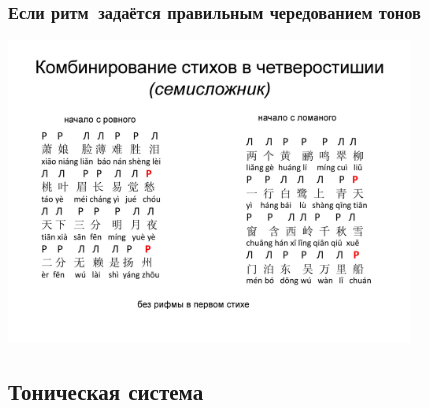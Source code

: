 \documentclass{beamer}
\begin{document}
\begin{frame}
\frametitle{Если ритм~задаётся правильным чередованием тонов}
\begin{center}
\includegraphics[width=0.8\textwidth]{cn.png}
\end{center}
\end{frame}


\subsection{Тоническая система}\label{sec:ton}
\end{document}
